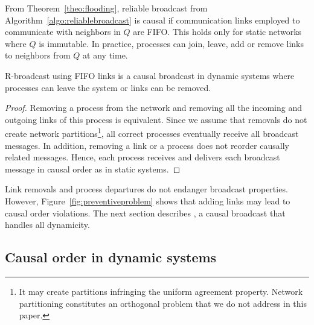 From Theorem~\ref{theo:flooding}, reliable broadcast from
Algorithm~\ref{algo:reliablebroadcast} is causal if communication links employed
to communicate with neighbors in $Q$ are FIFO. This holds only for static
networks where $Q$ is immutable. In practice, processes can join, leave, add or
remove links to neighbors from $Q$ at any time.

\begin{lemma}
  R-broadcast using FIFO links is a causal broadcast in dynamic systems where
  processes can leave the system or links can be removed.
\end{lemma}

\begin{proof}
  Removing a process from the network and removing all the incoming and outgoing
  links of this process is equivalent. Since we assume that removals do not
  create network partitions\footnote{It may create partitions infringing the
    uniform agreement property. Network partitioning constitutes an orthogonal
    problem that we do not address in this paper.}, all correct processes
  eventually receive all broadcast messages. In addition, removing a link or a
  process does not reorder causally related messages. Hence, each process
  receives and delivers each broadcast message in causal order as in static
  systems.
\end{proof}

Link removals and process departures do not endanger broadcast properties.
However, Figure~\ref{fig:preventiveproblem} shows that adding links may lead to
causal order violations. The next section describes \CBROADCAST, a causal
broadcast that handles all dynamicity.

\subsection{Causal order in dynamic systems}

